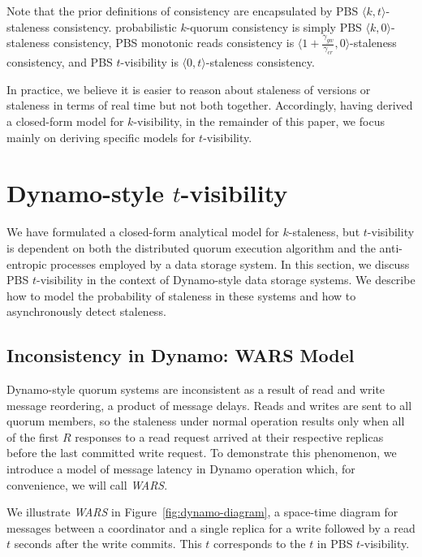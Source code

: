 \documentclass{vldb}
\newcommand{\sectionskip}{-0em}
\newcommand{\subsectionskip}{-0em}
\begin{document}
Note that the prior definitions of consistency are encapsulated by PBS
$\langle k, t \rangle$-staleness consistency. probabilistic $k$-quorum
consistency is simply PBS $\langle k, 0 \rangle$-staleness consistency,
PBS monotonic reads consistency is $\langle
1+\frac{\gamma_{gw}}{\gamma_{cr}}, 0 \rangle$-staleness consistency, and
PBS $t$-visibility is $\langle 0, t \rangle$-staleness consistency.

In practice, we believe it is easier to reason about staleness of
versions or staleness in terms of real time but not both together.
Accordingly, having derived a closed-form model for $k$-visibility, in
the remainder of this paper, we focus mainly on deriving specific models
for $t$-visibility.

\vspace{\sectionskip}\section{Dynamo-style $t$-visibility}
\label{sec:dynamo}

We have formulated a closed-form analytical model for $k$-staleness,
but $t$-visibility is dependent on both the distributed quorum
execution algorithm and the anti-entropic processes employed by a data
storage system.  In this section, we discuss PBS $t$-visibility in the
context of Dynamo-style data storage systems.  We describe how to
model the probability of staleness in these systems and how to
asynchronously detect staleness.

\vspace{\subsectionskip}\subsection{Inconsistency in Dynamo: WARS Model}

Dynamo-style quorum systems are inconsistent as a result of read and
write message reordering, a product of message delays.  Reads and
writes are sent to all quorum members, so the staleness under normal
operation results only when all of the first $R$ responses to a read
request arrived at their respective replicas before the last committed
write request.  To demonstrate this phenomenon, we introduce a model
of message latency in Dynamo operation which, for convenience, we will
call \textit{WARS}.

We illustrate \textit{WARS} in Figure~\ref{fig:dynamo-diagram}, a
space-time diagram for messages between a coordinator and a single
replica for a write followed by a read $t$ seconds after the write
commits.  This $t$ corresponds to the $t$ in PBS $t$-visibility.
\end{document}
